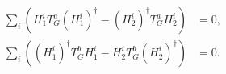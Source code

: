 \begin{equation}
\begin{aligned}
\sum_i \left(H^i_1 T^a_G (H^i_1)^{\dagger}-(H^i_2)^{\dagger} T^a_G H^i_2\right) & =0,\\
\sum_i \left((H^i_1)^{\dagger} T^b_G H^i_1-H^i_2 T^b_G (H^i_2)^{\dagger}\right) & =0.
\end{aligned}\label{EqDtermConstraints}
\end{equation}

